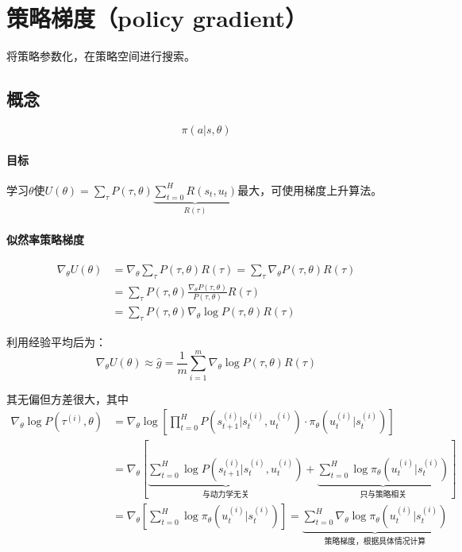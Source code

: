 \documentclass[
12pt, %
a4paper, 
oneside, %
headinclude,footinclude, %
]{scrartcl}
\begin{document}
\section[策略梯度]{策略梯度（policy gradient）}
将策略参数化，在策略空间进行搜索。
\subsection[概念]{概念}
$$ \pi(a|s, \theta) $$
\paragraph{目标}
学习$ \theta $使$ U(\theta) = \sum_{\tau} P(\tau, \theta) \underbrace{\sum_{t = 0}^H R(s_t, u_t)}_{R(\tau)} $最大，可使用梯度上升算法。
\paragraph{似然率策略梯度}
\begin{align*}
\nabla_\theta U(\theta) &= \nabla_\theta \sum_{\tau} P(\tau, \theta) R(\tau) = \sum_{\tau} \nabla_\theta P(\tau, \theta) R(\tau) \\
&= \sum_{\tau} P(\tau, \theta) \frac{\nabla_\theta P(\tau, \theta)}{P(\tau, \theta)} R(\tau) \\
&= \sum_{\tau} P(\tau, \theta) \nabla_\theta \log P(\tau, \theta) R(\tau)
\end{align*}

利用经验平均后为：
$$ \nabla_\theta U(\theta) \approx \hat{g} = \frac{1}{m} \sum_{i=1}^m \nabla_\theta \log P(\tau, \theta) R(\tau) $$

其无偏但方差很大，其中
\begin{align*}
\nabla_\theta\log P(\tau^{(i)}, \theta) &= \nabla_\theta\log[\prod_{t = 0}^{H} P(s_{t + 1}^{(i)}|s_t^{(i)},u_t^{(i)}) \cdot \pi_\theta(u_t^{(i)}|s_t^{(i)})] \\
&= \nabla_\theta[\underbrace{\sum_{t = 0}^{H} \log P(s_{t + 1}^{(i)}|s_t^{(i)},u_t^{(i)})}_{\text{与动力学无关}} + \underbrace{\sum_{t = 0}^{H}\log\pi_\theta(u_t^{(i)}|s_t^{(i)})}_{\text{只与策略相关}}] \\
&= \nabla_\theta[\sum_{t = 0}^{H} \log\pi_\theta(u_t^{(i)}|s_t^{(i)})] = \underbrace{\sum_{t = 0}^{H} \nabla_\theta\log\pi_\theta(u_t^{(i)}|s_t^{(i)})}_{\text{策略梯度，根据具体情况计算}}
\end{align*}
\end{document}
